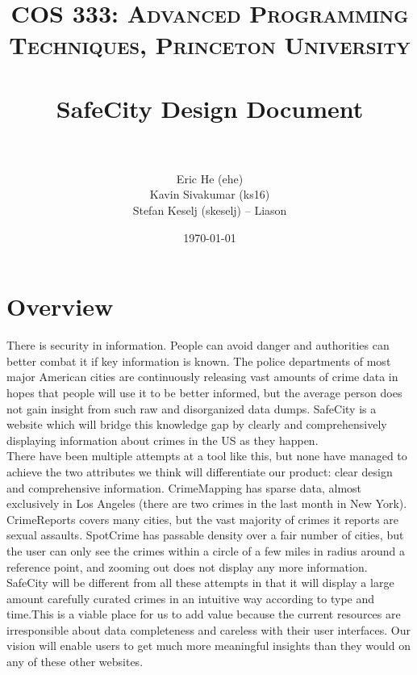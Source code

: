\documentclass[paper=a4, fontsize=11pt]{scrartcl} %
\title{	
\normalfont \normalsize 
\textsc{COS 333: Advanced Programming Techniques, Princeton University} \\ [25pt] %
\horrule{0.5pt} \\[0.4cm] %
\huge SafeCity Design Document \\ %
\horrule{2pt} \\[0.5cm] %
}
\author{
Eric He (ehe) \\
Kavin Sivakumar (ks16) \\
Stefan Keselj (skeselj) -- Liason}
\date{\normalsize\today} %
\numberwithin{equation}{section} %
\numberwithin{figure}{section} %
\numberwithin{table}{section} %
\begin{document}
\maketitle %


\section{Overview}

There is security in information. People can avoid danger and authorities can better combat it if key information is known. The police departments of most major American cities are continuously releasing vast amounts of crime data in hopes that people will use it to be better informed, but the average person does not gain insight from such raw and disorganized data dumps. SafeCity is a website which will bridge this knowledge gap by clearly and comprehensively displaying information about crimes in the US as they happen. \\

There have been multiple attempts at a tool like this, but none have managed to achieve the two attributes we think will differentiate our product: clear design and comprehensive information. CrimeMapping has sparse data, almost exclusively in Los Angeles (there are two crimes in the last month in New York). CrimeReports covers many cities, but the vast majority of crimes it reports are sexual assaults. SpotCrime has passable density over a fair number of cities, but the user can only see the crimes within a circle of a few miles in radius around a reference point, and zooming out does not display any more information. \\

SafeCity will be different from all these attempts in that it will display a large amount carefully curated crimes in an intuitive way according to type and time.This is a viable place for us to add value because the current resources are irresponsible about data completeness and careless with their user interfaces. Our vision will enable users to get much more meaningful insights than they would on any of these other websites.


\end{document}
